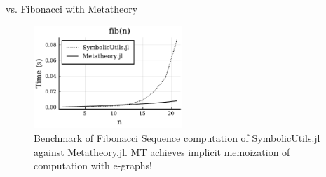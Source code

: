 \documentclass[8pt]{beamer}  %
\begin{document}
\begin{frame}[fragile]{vs. Fibonacci with Metatheory}
\begin{figure}
    \centering
    \includegraphics[width=0.5\textwidth]{fib.pdf}
    \caption{Benchmark of Fibonacci Sequence computation of SymbolicUtils.jl against Metatheory.jl. MT achieves implicit memoization of computation with e-graphs!}
    \label{fig:my_label}
\end{figure}
\end{frame}






\end{document}
